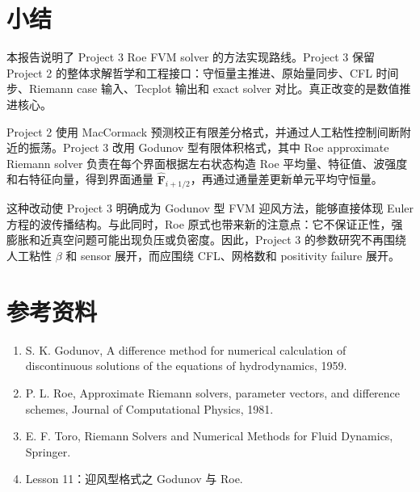 \section{小结}

本报告说明了 Project 3 Roe FVM solver 的方法实现路线。Project 3 保留 Project 2 的整体求解哲学和工程接口：守恒量主推进、原始量同步、CFL 时间步、Riemann case 输入、Tecplot 输出和 exact solver 对比。真正改变的是数值推进核心。

Project 2 使用 MacCormack 预测校正有限差分格式，并通过人工粘性控制间断附近的振荡。Project 3 改用 Godunov 型有限体积格式，其中 Roe approximate Riemann solver 负责在每个界面根据左右状态构造 Roe 平均量、特征值、波强度和右特征向量，得到界面通量 \(\hat{\bm F}_{i+1/2}\)，再通过通量差更新单元平均守恒量。

这种改动使 Project 3 明确成为 Godunov 型 FVM 迎风方法，能够直接体现 Euler 方程的波传播结构。与此同时，Roe 原式也带来新的注意点：它不保证正性，强膨胀和近真空问题可能出现负压或负密度。因此，Project 3 的参数研究不再围绕人工粘性 \(\beta\) 和 sensor 展开，而应围绕 CFL、网格数和 positivity failure 展开。

\section*{参考资料}

\begin{enumerate}[leftmargin=2em]
    \item S. K. Godunov, A difference method for numerical calculation of discontinuous solutions of the equations of hydrodynamics, 1959.
    \item P. L. Roe, Approximate Riemann solvers, parameter vectors, and difference schemes, Journal of Computational Physics, 1981.
    \item E. F. Toro, Riemann Solvers and Numerical Methods for Fluid Dynamics, Springer.
    \item Lesson 11：迎风型格式之 Godunov 与 Roe.
\end{enumerate}

